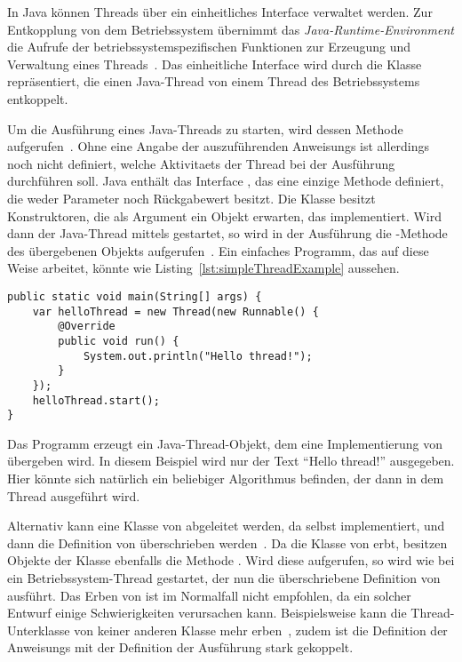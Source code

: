 In Java können Threads über ein einheitliches Interface verwaltet werden. Zur Entkopplung von dem Betriebssystem übernimmt das \emph{Java-Runtime-Environment} die Aufrufe der betriebssystemspezifischen Funktionen zur Erzeugung und Verwaltung eines Threads~\cite[S.~3]{Friesen2015}. Das einheitliche Interface wird durch die Klasse \classThread{} repräsentiert, die einen Java-Thread von einem Thread des  Betriebssystems entkoppelt. 

Um die Ausführung eines Java-Threads zu starten, wird dessen Methode  aufgerufen~\cite[S.~8]{Friesen2015}. Ohne eine Angabe der auszuführenden \glspl{Anweisung} ist allerdings noch nicht definiert, welche \glspl{Aktivitaet} der Thread bei der Ausführung durchführen soll. Java enthält das Interface \classRunnable{}, das eine einzige Methode  definiert, die weder Parameter noch Rückgabewert besitzt. Die Klasse \classThread{} besitzt Konstruktoren, die als Argument ein Objekt erwarten, das \classRunnable{} implementiert. Wird dann der Java-Thread mittels  gestartet, so wird in der Ausführung die -Methode des übergebenen Objekts aufgerufen~\cite[S.~3]{Friesen2015}. Ein einfaches \gls{Programm}, das auf diese Weise arbeitet, könnte wie Listing~\ref{lst:simpleThreadExample} aussehen.
\begin{lstlisting}[caption={[Beispiel für ein Java-\glsentrytext{Programm}, das einen Thread mit einem \classRunnable{}-Objekt erzeugt und dann startet]Beispiel für ein Java-\gls{Programm}, das einen Thread mit einem \classRunnable{}-Objekt erzeugt und dann startet.},label={lst:simpleThreadExample},float={htbp}]
public static void main(String[] args) {
	var helloThread = new Thread(new Runnable() {
		@Override
		public void run() {
			System.out.println("Hello thread!");
		}
	});
	helloThread.start();
}
\end{lstlisting}
Das \gls{Programm} erzeugt ein Java-Thread-Objekt, dem eine Implementierung von \classRunnable{} übergeben wird. In diesem Beispiel wird nur der Text \enquote{Hello thread!} ausgegeben. Hier könnte sich natürlich ein beliebiger Algorithmus befinden, der dann in dem Thread ausgeführt wird.

Alternativ kann eine Klasse von \classThread{} abgeleitet werden, da \classThread{} selbst \classRunnable{} implementiert, und dann die Definition von  überschrieben werden~\cite[S.~335]{Rauber2006}. Da die Klasse von \classThread{} erbt, besitzen Objekte der Klasse ebenfalls die Methode . Wird diese aufgerufen, so wird wie bei \classThread{} ein Betriebssystem-Thread gestartet, der nun die überschriebene Definition von  ausführt. Das Erben von \classThread{} ist im Normalfall nicht empfohlen, da ein solcher Entwurf einige Schwierigkeiten verursachen kann. Beispielsweise kann die Thread-Unterklasse von keiner anderen Klasse mehr erben~\cite[S.~335]{Rauber2006}, zudem ist die Definition der \glspl{Anweisung} mit der Definition der Ausführung stark gekoppelt.


